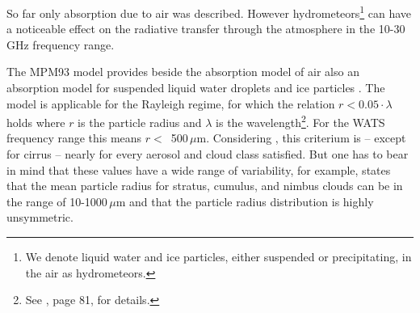 {
\label{levelc:ArtsImplementationCompleteModels}



\label{labela:cloudabsorption}

\label{levelb:lipartabs}
So far only absorption due to air was described. However 
hydrometeors\footnote{We denote liquid water and ice particles, either
  suspended or precipitating, in the air as hydrometeors.}
can have a noticeable effect on the radiative transfer through the
atmosphere in the 10-30\,GHz frequency range.

The MPM93 model provides beside the absorption model of air also an
absorption model for suspended liquid water droplets and ice particles
\citep{liebe:89b,liebeetal:91,hufford:91,liebeetal:93}.  The model is
applicable for the Rayleigh regime, for which the relation $r <
0.05\cdot \lambda$ holds where $r$ is the particle radius and
$\lambda$ is the wavelength\footnote{See \citet{brussaard:95}, page
  81, for details.}. For the WATS frequency range this means $r
<$~500\,$\mu$m. Considering \citet{salby:96}, this criterium is --
except for cirrus -- nearly for every aerosol and cloud class
satisfied. But one has to bear in mind that these values have a wide
range of variability, for example, \citet{salby:96} states that the
mean particle radius for stratus, cumulus, and nimbus clouds can be in
the range of 10-1000\,$\mu$m and that the particle radius distribution
is highly unsymmetric. 

}

